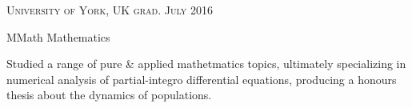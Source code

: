 
\textsc{\small{University of York, UK
	\hfill
    grad. July 2016
}}

{\large MMath Mathematics}

\raggedright

Studied a range of pure \& applied mathetmatics topics, ultimately specializing in numerical analysis of partial-integro differential equations, producing a honours thesis about the dynamics of populations.